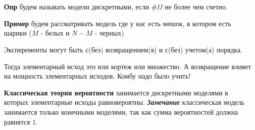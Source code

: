 \section{}

\textbf{Опр} будем называть модели дискретными, если $\#\Omega$ не более чем счетно.

\textbf{Пример} будем рассматривать модель где у нас есть мешок, в котором есть шарики ($M$ - белых и $N - M$ - черных)

Эксперементы могут быть с(без) возвращением(я) и с(без) учетом(а) порядка.

Тогда элементарный исход это или кортеж или множество. А возвращение влияет на
мощность элементарных исходов. Комбу надо было учить!

\textbf{Классическая теория вероятности} занимается дискретными моделями в
которых элементарные исходы равновероятны. \textbf{\textit{Замечание} }классическая модель занимается только конечными моделями, так как сумма вероятностей должна равнятся $1$.

